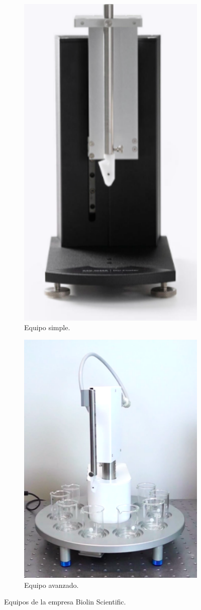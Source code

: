 \begin{figure}[!htpb]
     \centering
     \begin{subfigure}[b]{0.4\textwidth}
         \centering
         \includegraphics[width=.45\textwidth]{./Figures/dip_biolin.pdf}
         \caption{Equipo simple.}
         \label{fig:dip_biolin}
     \end{subfigure}
     \hfill
     \begin{subfigure}[b]{0.4\textwidth}
         \centering
         \includegraphics[width=.65\textwidth]{./Figures/dip_biolin_2.pdf}
         \caption{Equipo avanzado.}
         \label{fig:dip_biolin_2}
     \end{subfigure}
     \hfill
        \caption{Equipos de la empresa Biolin Scientific.}
        \label{fig:equipos_biolin}
\end{figure}


